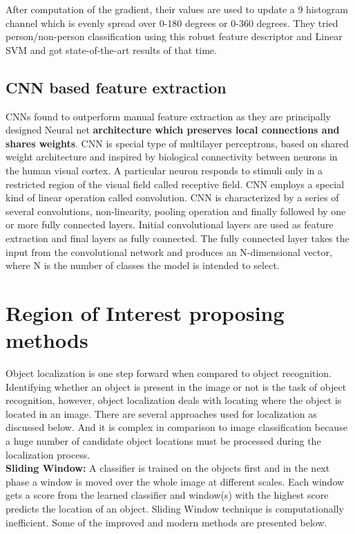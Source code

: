 \newpara After computation of the gradient, their values are used to update a 9 histogram channel which is evenly spread over 0-180 degrees or 0-360 degrees. They tried person/non-person classification using this robust feature descriptor and Linear SVM and got state-of-the-art results of that time.

\subsection{CNN based feature extraction}
\newpara CNNs found to outperform manual feature extraction as they are principally designed Neural net \textbf{architecture which preserves local connections and shares weights}. CNN is special type of multilayer perceptrons, based on shared weight architecture and inspired by biological connectivity between neurons in the human visual cortex. A particular neuron responds to stimuli only in a restricted region of the visual field called receptive field. CNN employs a special kind of linear operation called convolution. CNN is characterized by a series of several convolutions, non-linearity, pooling operation and finally followed by one or more fully connected layers. Initial convolutional layers are used as feature extraction and final layers as fully connected. The fully connected layer takes the input from the convolutional network and produces an N-dimensional vector, where N is the number of classes the model is intended to select.


\section{Region of Interest proposing methods}
Object localization is one step forward when compared to object recognition. Identifying whether an object is present in the image or not is the task of object recognition, however, object localization deals with locating where the object is located in an image. There are several approaches used for localization as discussed below. And it is complex in comparison to image classification because a huge number of candidate object locations must be processed during the localization process. \\

\textbf{Sliding Window:} A classifier is trained on the objects first and in the next phase a window is moved over the whole image at different scales. Each window gets a score from the learned classifier and window(s) with the highest score predicts the location of an object. Sliding Window technique is computationally inefficient. Some of the improved and modern methods are presented below. 

